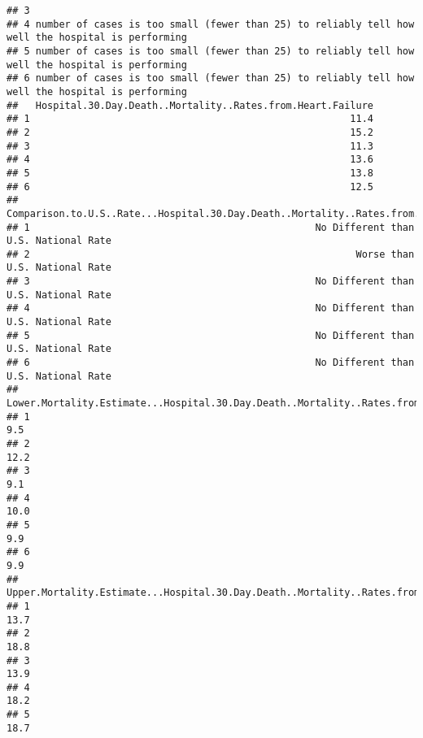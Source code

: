 \documentclass[]{article}
\begin{document}
\begin{verbatim}
## 3                                                                                                  
## 4 number of cases is too small (fewer than 25) to reliably tell how well the hospital is performing
## 5 number of cases is too small (fewer than 25) to reliably tell how well the hospital is performing
## 6 number of cases is too small (fewer than 25) to reliably tell how well the hospital is performing
##   Hospital.30.Day.Death..Mortality..Rates.from.Heart.Failure
## 1                                                       11.4
## 2                                                       15.2
## 3                                                       11.3
## 4                                                       13.6
## 5                                                       13.8
## 6                                                       12.5
##   Comparison.to.U.S..Rate...Hospital.30.Day.Death..Mortality..Rates.from.Heart.Failure
## 1                                                 No Different than U.S. National Rate
## 2                                                        Worse than U.S. National Rate
## 3                                                 No Different than U.S. National Rate
## 4                                                 No Different than U.S. National Rate
## 5                                                 No Different than U.S. National Rate
## 6                                                 No Different than U.S. National Rate
##   Lower.Mortality.Estimate...Hospital.30.Day.Death..Mortality..Rates.from.Heart.Failure
## 1                                                                                   9.5
## 2                                                                                  12.2
## 3                                                                                   9.1
## 4                                                                                  10.0
## 5                                                                                   9.9
## 6                                                                                   9.9
##   Upper.Mortality.Estimate...Hospital.30.Day.Death..Mortality..Rates.from.Heart.Failure
## 1                                                                                  13.7
## 2                                                                                  18.8
## 3                                                                                  13.9
## 4                                                                                  18.2
## 5                                                                                  18.7

\end{verbatim}
\end{document}
